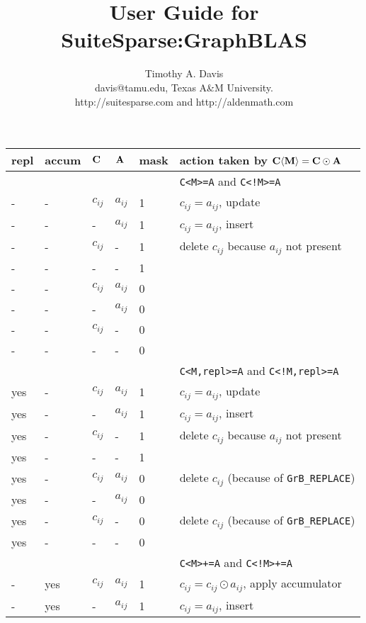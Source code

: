 \documentclass[12pt]{article}
\title{User Guide for SuiteSparse:GraphBLAS}
\author{Timothy A. Davis \\
\small
davis@tamu.edu, Texas A\&M University. \\
\small
http://suitesparse.com and http://aldenmath.com
}
\begin{document}
\begin{table}
{\small
\begin{tabular}{lllll|l}
\hline
repl & accum & ${\bf C}$ & ${\bf A}$ & mask & action taken by ${\bf C \langle M \rangle = C \odot A}$ \\
\hline
\hline
       &    &          &           &      & \verb'C<M>=A' and \verb'C<!M>=A' \\
\hline
    -  &-   & $c_{ij}$ & $a_{ij}$  & 1    &  $c_{ij} = a_{ij}$, update \\
    -  &-   &  -       & $a_{ij}$  & 1    &  $c_{ij} = a_{ij}$, insert \\
    -  &-   & $c_{ij}$ &  -        & 1    &  delete $c_{ij}$ because $a_{ij}$ not present \\
    -  &-   &  -       &  -        & 1    &   \\
\hline
    -  &-   & $c_{ij}$ & $a_{ij}$  & 0    &   \\
    -  &-   &  -       & $a_{ij}$  & 0    &   \\
    -  &-   & $c_{ij}$ &  -        & 0    &   \\
    -  &-   &  -       &  -        & 0    &   \\
\hline
\hline
       &    &          &           &      & \verb'C<M,repl>=A' and \verb'C<!M,repl>=A' \\
\hline
    yes&-   & $c_{ij}$ & $a_{ij}$  & 1    &  $c_{ij} = a_{ij}$, update \\
    yes&-   &  -       & $a_{ij}$  & 1    &  $c_{ij} = a_{ij}$, insert \\
    yes&-   & $c_{ij}$ &  -        & 1    &  delete $c_{ij}$ because $a_{ij}$ not present \\
    yes&-   &  -       &  -        & 1    &   \\
\hline
    yes&-   & $c_{ij}$ & $a_{ij}$  & 0    &  delete $c_{ij}$  (because of \verb'GrB_REPLACE') \\
    yes&-   &  -       & $a_{ij}$  & 0    &   \\
    yes&-   & $c_{ij}$ &  -        & 0    &  delete $c_{ij}$  (because of \verb'GrB_REPLACE') \\
    yes&-   &  -       &  -        & 0    &   \\
\hline
\hline
       &    &          &           &      & \verb'C<M>+=A' and \verb'C<!M>+=A' \\
\hline
    -  &yes & $c_{ij}$ & $a_{ij}$  & 1    &  $c_{ij} = c_{ij} \odot a_{ij}$, apply accumulator \\
    -  &yes &  -       & $a_{ij}$  & 1    &  $c_{ij} = a_{ij}$, insert \\

\end{tabular}}
\end{table}
\end{document}
